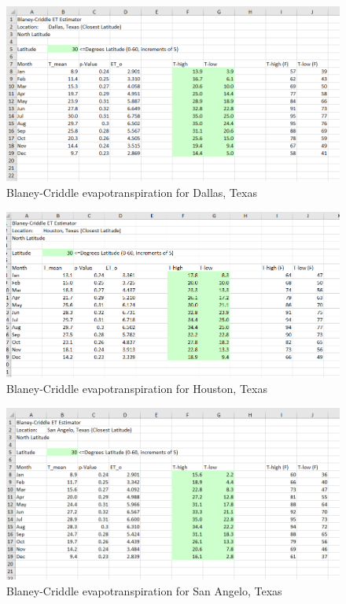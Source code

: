\documentclass[12pt]{article}
\begin{document}
\begin{enumerate}
\begin{figure}[h!] %
   \centering
   \includegraphics[width=6in]{bcdallas.png} 
   \caption{Blaney-Criddle evapotranspiration for Dallas, Texas}
   \label{fig:bcdallas}
\end{figure}

\begin{figure}[h!] %
   \centering
   \includegraphics[width=6in]{bchouston.png} 
   \caption{Blaney-Criddle evapotranspiration for Houston, Texas}
   \label{fig:bchouston}
\end{figure}

\begin{figure}[h!] %
   \centering
   \includegraphics[width=6in]{bcsanangelo.png} 
   \caption{Blaney-Criddle evapotranspiration for San Angelo, Texas}
   \label{fig:bcsanangelo}
\end{figure}


\end{enumerate}
\end{document}
